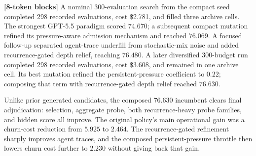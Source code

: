 \documentclass[11pt]{article}
\newcommand{\blocktag}[1]{\textbf{\color{navy}[#1-token blocks]}}
\begin{document}
\blocktag{8} A nominal 300-evaluation search from the compact seed completed 298 recorded
evaluations, cost \$2.781, and filled three archive cells.  The strongest GPT-5.5
paradigm scored \(74.670\); a subsequent compact mutation refined its pressure-aware
admission mechanism and reached \(76.069\). A focused follow-up separated agent-trace
underfill from stochastic-mix noise and added recurrence-gated depth relief, reaching
\(76.480\). A later diversified 300-budget run completed 298 recorded evaluations,
cost \$3.608, and remained in one archive cell. Its best mutation refined the
persistent-pressure coefficient to \(0.22\); composing that term with recurrence-gated
depth relief reached \(76.630\).

\begin{center}
\scriptsize
{}
\end{center}

Unlike prior generated candidates, the composed \(76.630\) incumbent clears final
adjudication: selection, aggregate probe, both recurrence-heavy probe families, and
hidden score all improve. The original policy's main operational gain was a churn-cost
reduction from \(5.925\) to \(2.464\). The recurrence-gated refinement sharply improves
agent traces, and the composed persistent-pressure throttle then lowers churn cost
further to \(2.230\) without giving back that gain.
\end{document}
